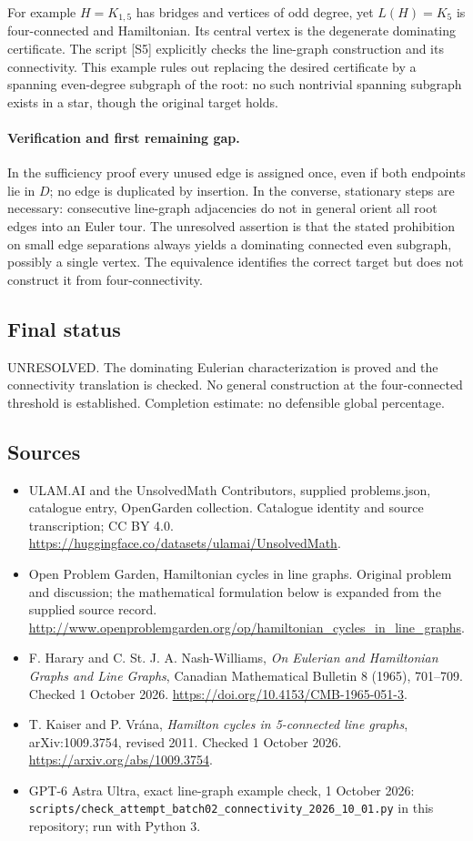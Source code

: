 \documentclass[11pt,a4paper]{article}
\begin{document}
For example $H=K_{1,5}$ has bridges and vertices of odd degree, yet
$L(H)=K_5$ is four-connected and Hamiltonian. Its central vertex is
the degenerate dominating certificate. The script [S5] explicitly checks
the line-graph construction and its connectivity. This example rules
out replacing the desired certificate by a spanning even-degree
subgraph of the root: no such nontrivial spanning subgraph exists
in a star, though the original target holds.

\paragraph{Verification and first remaining gap.}
In the sufficiency proof every unused edge is assigned once, even
if both endpoints lie in $D$; no edge is duplicated by insertion.
In the converse, stationary steps are necessary: consecutive
line-graph adjacencies do not in general orient all root edges into
an Euler tour. The unresolved assertion is that the stated prohibition
on small edge separations always yields a dominating connected even
subgraph, possibly a single vertex. The equivalence identifies the
correct target but does not construct it from four-connectivity.

\subsection{Final status}
UNRESOLVED. The dominating Eulerian characterization is proved and the
connectivity translation is checked. No general construction at the
four-connected threshold is established. Completion estimate: no
defensible global percentage.

\subsection{Sources}
\begin{itemize}
\item[S1] ULAM.AI and the UnsolvedMath Contributors, supplied problems.json, catalogue entry, OpenGarden collection. Catalogue identity and source transcription; CC BY 4.0.
\url{https://huggingface.co/datasets/ulamai/UnsolvedMath}.
\item[S2] Open Problem Garden, Hamiltonian cycles in line graphs. Original problem and discussion; the mathematical formulation below is expanded from the supplied source record.
\url{http://www.openproblemgarden.org/op/hamiltonian_cycles_in_line_graphs}.
\item[S3] F. Harary and C. St. J. A. Nash-Williams, \emph{On Eulerian and Hamiltonian Graphs and Line Graphs}, Canadian Mathematical Bulletin 8 (1965), 701--709. Checked 1 October 2026.
\url{https://doi.org/10.4153/CMB-1965-051-3}.
\item[S4] T. Kaiser and P. Vrána, \emph{Hamilton cycles in 5-connected line graphs}, arXiv:1009.3754, revised 2011. Checked 1 October 2026.
\url{https://arxiv.org/abs/1009.3754}.
\item[S5] GPT-6 Astra Ultra, exact line-graph example check, 1 October 2026: \texttt{scripts/check\_attempt\_batch02\_connectivity\_2026\_10\_01.py} in this repository; run with Python 3.
\end{itemize}
\end{document}
